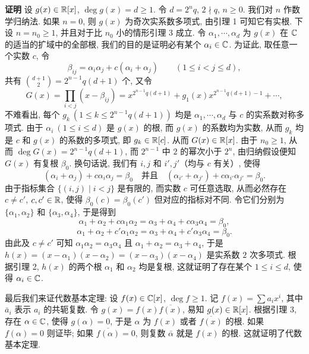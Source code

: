 \textbf{证明} 设 $g(x)\in\mathbb{R}[x]$, $\deg g(x)=d\geqslant 1$. 令 $d=2^nq$, $2\nmid q$, $n\geqslant 0$. 我们对 $n$ 作数学归纳法. 如果 $n=0$, 则 $g(x)$ 为奇次实系数多项式, 由引理 1 可知它有实根. 下设 $n=n_0\geqslant 1$, 并且对于比 $n_0$ 小的情形引理 3 成立. 令 $\alpha_1,\cdots,\alpha_d$ 为 $g(x)$ 在 $\mathbb{C}$ 的适当的扩域中的全部根, 我们的目的是证明必有某个 $\alpha_i\in\mathbb{C}$. 为证此, 取任意一个实数 $c$, 令
\[
  \beta_{ij}=\alpha_i\alpha_j+c(\alpha_i+\alpha_j)\qquad(1\leqslant i<j\leqslant d),
\]
共有 $\binom{d+1}{2}=2^{n-1}q(d+1)$ 个, 又令
\[
  G(x)=\prod_{i<j}(x-\beta_{ij})=x^{2^{n-1}q(d+1)}+g_1(x)x^{2^{n-1}q(d+1)-1}+\cdots,
\]
不难看出, 每个 $g_k\ (1\leqslant k\leqslant 2^{n-1}q(d+1))$ 均是 $\alpha_1,\cdots,\alpha_d$ 与 $c$ 的实系数对称多项式. 由于 $\alpha_i\ (1\leqslant i\leqslant d)$ 是 $g(x)$ 的根, 而 $g(x)$ 的系数均为实数, 从而 $g_k$ 均是 $c$ 和 $g(x)$ 的系数的多项式, 即 $g_k\in\mathbb{R}[c]$. 从而 $G(x)\in\mathbb{R}[x]$. 由于 $n_0\geqslant 1$, 从而 $\deg G(x)=2^{n-1}q(d+1)$, 而 $2^{n-1}$ 中 $2$ 的幂次小于 $2^n$, 由归纳假设便知 $G(x)$ 有复根 $\beta_0$. 换句话说, 我们有 $i,j$ 和 $i',j'$（均与 $c$ 有关）, 使得
\[
  (\alpha_i+\alpha_j)+c\alpha_i\alpha_j=\beta_0
  \quad\text{并且}\quad
  (\alpha_{i'}+\alpha_{j'})+c\alpha_{i'}\alpha_{j'}=\beta_0.
\]
由于指标集合 $\{(i,j)\mid i<j\}$ 是有限的, 而实数 $c$ 可任意选取, 从而必然存在 $c\neq c'$, $c,c'\in\mathbb{R}$, 使得 $\beta_0(c)=\beta_0(c')$ 但对应的指标对不同. 令它们分别为 $\{\alpha_1,\alpha_2\}$ 和 $\{\alpha_3,\alpha_4\}$, 于是得到
\[
  \alpha_1+\alpha_2+c\alpha_1\alpha_2=\alpha_3+\alpha_4+c\alpha_3\alpha_4=\beta_0,
\]
\[
  \alpha_1+\alpha_2+c'\alpha_1\alpha_2=\alpha_3+\alpha_4+c'\alpha_3\alpha_4=\beta_0.
\]
由此及 $c\neq c'$ 可知 $\alpha_1\alpha_2=\alpha_3\alpha_4$ 且 $\alpha_1+\alpha_2=\alpha_3+\alpha_4$, 于是 $h(x)=(x-\alpha_1)(x-\alpha_2)=(x-\alpha_3)(x-\alpha_4)$ 是实系数 $2$ 次多项式. 根据引理 2, $h(x)$ 的两个根 $\alpha_1$ 和 $\alpha_2$ 均是复根, 这就证明了存在某个 $1\leqslant i\leqslant d$, 使得 $\alpha_i\in\mathbb{C}$.

最后我们来证代数基本定理: 设 $f(x)\in\mathbb{C}[x]$, $\deg f\geqslant 1$. 记 $f(x)=\sum a_ix^i$, 其中 $\bar{a}_i$ 表示 $a_i$ 的共轭复数. 令 $g(x)=f(x)\overline{f(x)}$, 易知 $g(x)\in\mathbb{R}[x]$. 根据引理 3, 存在 $\alpha\in\mathbb{C}$, 使得 $g(\alpha)=0$, 于是 $\alpha$ 为 $f(x)$ 或者 $\overline{f(x)}$ 的根. 如果 $f(\alpha)=0$ 则证毕; 如果 $\overline{f(\alpha)}=0$, 则复数 $\bar{\alpha}$ 就是 $f(x)$ 的根. 这就证明了代数基本定理.
